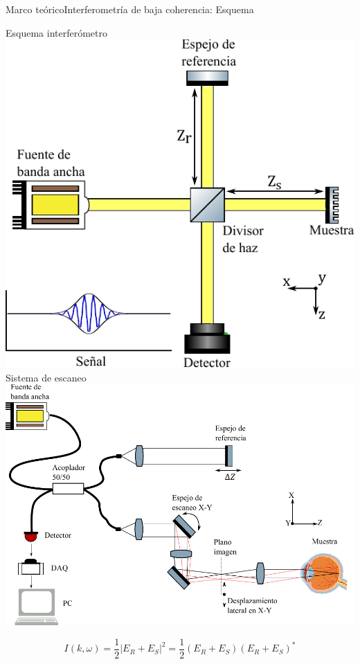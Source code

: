 \documentclass[fleqn,10pt]{beamer}
\begin{document}
\begin{frame}{Marco teórico}{Interferometría de baja coherencia: Esquema}
	\begin{multicols}{2}
	\centering
	Esquema interferómetro
	\hspace*{-0.6cm}
	\includegraphics[width=0.9\linewidth]{AAUgraphics/pt2/Carlos_oct_scheme}
	\newpage
	\pause
	Sistema de escaneo
	\hspace*{-0.8cm}
	\includegraphics[width=1.2\linewidth]{AAUgraphics/pt2/scaning_system_oc}
	\end{multicols}
		
	\vfill
	
		\begin{equation*}
			I(k,\omega) = \frac{1}{2} \lvert E_R+E_S \rvert^2  = \frac{1}{2} (E_R+E_S)(E_R+E_S)^\ast	
		\end{equation*}
\end{frame}
\end{document}
